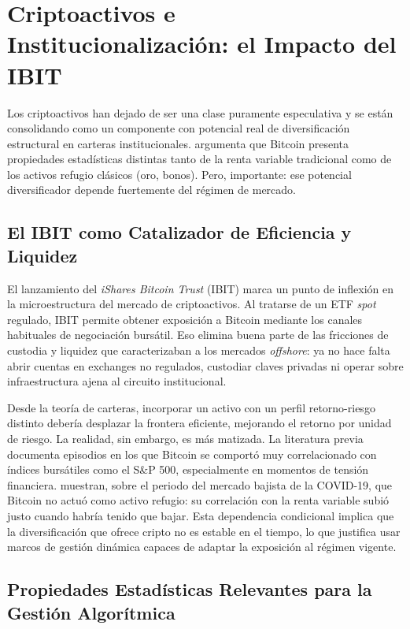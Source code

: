 \documentclass[IB,a4paper]{TFUOC}
\begin{document}
\section{Criptoactivos e Institucionalización: el Impacto del IBIT}

Los criptoactivos han dejado de ser una clase puramente especulativa y se están consolidando como un componente con potencial real de diversificación estructural en carteras institucionales. \citet{hougan2021crypto} argumenta que Bitcoin presenta propiedades estadísticas distintas tanto de la renta variable tradicional como de los activos refugio clásicos (oro, bonos). Pero, importante: ese potencial diversificador depende fuertemente del régimen de mercado.

\subsection{El IBIT como Catalizador de Eficiencia y Liquidez}

El lanzamiento del \textit{iShares Bitcoin Trust} (IBIT) marca un punto de inflexión en la microestructura del mercado de criptoactivos. Al tratarse de un ETF \textit{spot} regulado, IBIT permite obtener exposición a Bitcoin mediante los canales habituales de negociación bursátil. Eso elimina buena parte de las fricciones de custodia y liquidez que caracterizaban a los mercados \textit{offshore}: ya no hace falta abrir cuentas en exchanges no regulados, custodiar claves privadas ni operar sobre infraestructura ajena al circuito institucional.

Desde la teoría de carteras, incorporar un activo con un perfil retorno-riesgo distinto debería desplazar la frontera eficiente, mejorando el retorno por unidad de riesgo. La realidad, sin embargo, es más matizada. La literatura previa documenta episodios en los que Bitcoin se comportó muy correlacionado con índices bursátiles como el S\&P 500, especialmente en momentos de tensión financiera. \citet{conlon2020safehaven} muestran, sobre el periodo del mercado bajista de la COVID-19, que Bitcoin no actuó como activo refugio: su correlación con la renta variable subió justo cuando habría tenido que bajar. Esta dependencia condicional implica que la diversificación que ofrece cripto no es estable en el tiempo, lo que justifica usar marcos de gestión dinámica capaces de adaptar la exposición al régimen vigente.

\subsection{Propiedades Estadísticas Relevantes para la Gestión Algorítmica}
\end{document}
